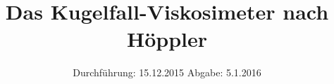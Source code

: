 

\subject{VERSUCH NUMMER 107}
\title{Das Kugelfall-Viskosimeter nach Höppler}
\date{
  Durchführung: 15.12.2015
  \hspace{3em}
  Abgabe:  5.1.2016
}



\maketitle
\thispagestyle{empty}
\tableofcontents
\newpage







\printbibliography


